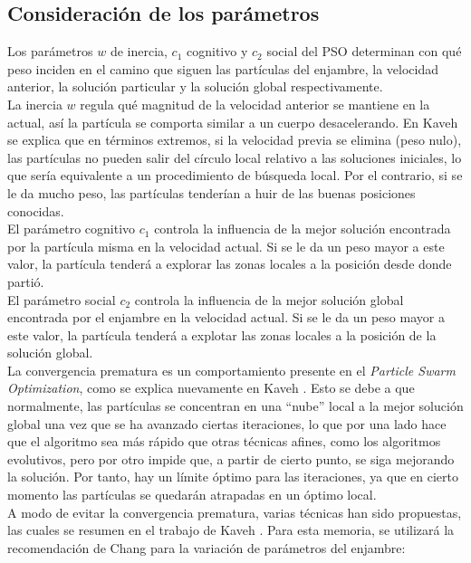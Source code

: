 \subsection{Consideración de los parámetros}
Los parámetros $w$ de inercia, $c_1$ cognitivo y $c_2$ social del PSO determinan con qué peso inciden en el camino que siguen las partículas del enjambre, la velocidad anterior, la solución particular y la solución global respectivamente.\\ 
La inercia $w$ regula qué magnitud de la velocidad anterior se mantiene en la actual, así la partícula se comporta similar a un cuerpo desacelerando. En Kaveh \cite{Psoexplain14} se explica que en términos extremos, si la velocidad previa se elimina (peso nulo), las partículas no pueden salir del círculo local relativo a las soluciones iniciales, lo que sería equivalente a un procedimiento de búsqueda local.  Por el contrario, si se le da mucho peso, las partículas tenderían a huir de las buenas posiciones conocidas.\\
El parámetro cognitivo $c_1$ controla la influencia de la mejor solución encontrada por la partícula misma en la velocidad actual. Si se le da un peso mayor a este valor, la partícula tenderá a explorar las zonas locales a la posición desde donde partió.\\
El parámetro social $c_2$ controla la influencia de la mejor solución global encontrada por el enjambre en la velocidad actual. Si se le da un peso mayor a este valor, la partícula tenderá a explotar las zonas locales a la posición de la solución global.\\
La convergencia prematura es un comportamiento presente en el \emph{Particle Swarm Optimization}, como se explica nuevamente en Kaveh \cite{Psoexplain14}. Esto se debe a que normalmente, las partículas se concentran en una ``nube'' local a la mejor solución global una vez que se ha avanzado ciertas iteraciones, lo que por una lado hace que el algoritmo sea más rápido que otras técnicas afines, como los algoritmos evolutivos, pero por otro impide que, a partir de cierto punto, se siga mejorando la solución. Por tanto, hay un límite óptimo para las iteraciones, ya que en cierto momento las partículas se quedarán atrapadas en un óptimo local.\\
A modo de evitar la convergencia prematura, varias técnicas han sido propuestas, las cuales se resumen en el trabajo de Kaveh \cite{Psoexplain14}. Para esta memoria, se utilizará la recomendación de Chang \cite{Chang10_2} para la variación de parámetros del enjambre:
